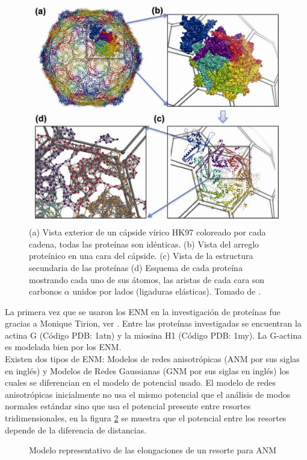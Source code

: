 \begin{figure}
\centering%
\includegraphics[scale=0.28]{Kap2/dibujo.pdf}%
\caption{ (a) Vista exterior de un c\'{a}pside v\'{i}rico HK97 coloreado por cada cadena, todas las prote\'{i}nas son id\'{e}nticas. (b) Vista del arreglo prote\'{i}nico en una cara del c\'{a}pside. (c) Vista de la estructura secundaria de las prote\'{i}nas (d) Esquema de cada prote\'{i}na mostrando cada uno de sus \'{a}tomos, las aristas de cada cara son carbonos $\alpha$ unidos por lados (ligaduras el\'{a}sticas). Tomado de \cite{Lezon2009}.} \label{fig:pan}
\end{figure}

La primera vez que se usaron los ENM en la investigaci\'{o}n de prote\'{i}nas fue gracias a Monique Tirion, ver \cite{Tirion1996}. Entre las prote\'{i}nas  investigadas se encuentran la actina G (C\'{o}digo PDB: 1atn) y la miosina H1 (C\'{o}digo PDB: 1my). La G-actina es modelada bien por los ENM.\\ 

Existen dos tipos de ENM: Modelos de redes anisotr\'{o}picas (ANM por sus siglas en ingl\'{e}s) y Modelos de Redes Gaussianas (GNM por sus siglas en ingl\'{e}s) los cuales se diferencian en el modelo de potencial usado.  El modelo de redes anisotr\'{o}picas inicialmente no usa el mismo potencial que el an\'{a}lisis de modos normales est\'{a}ndar sino que usa el potencial presente entre resortes tridimensionales, en la figura \ref{fig:ANM} se muestra que el potencial entre los resortes depende de la diferencia de distancias.\\
\begin{figure}
\centering
%
\caption{Modelo representativo de las elongaciones de un resorte para ANM} \label{fig:ANM}
\end{figure}
